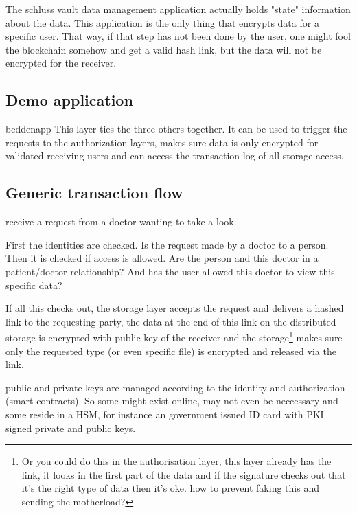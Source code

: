 \documentclass{article}
\begin{document}
The schluss vault data management application actually holds "state" information about the data. This application is the only thing that encrypts data for a specific user. That way, if that step has not been done by the user, one might fool the blockchain somehow and get a valid hash link, but the data will not be encrypted for the receiver.

\subsection{Demo application}
beddenapp
This layer ties the three others together. It can be used to trigger the requests to the authorization layers, makes sure data is only encrypted for validated receiving users and can access the transaction log of all storage access.

\subsection{Generic transaction flow}
receive a request from a doctor wanting to take a look. 

First the identities are checked. Is the request made by a doctor to a person. Then it is checked if access is allowed. Are the person and this doctor in a patient/doctor relationship? And has the user allowed this doctor to view this specific data? 

If all this checks out, the storage layer accepts the request and delivers a hashed link to the requesting party, the data at the end of this link on the distributed storage is encrypted with public key of the receiver and the storage\footnote{Or you could do this in the authorisation layer, this layer already has the link, it looks in the first part of the data and if the signature checks out that it's the right type of data then it's oke. how to prevent faking this and sending the motherload?} makes sure only  the requested type (or even specific file) is encrypted and released via the link.

public and private keys are managed according to the identity and authorization (smart contracts). So some might exist online, may not even be neccessary and some reside in a HSM, for instance an government issued ID card with PKI signed private and public keys.

\end{document}
